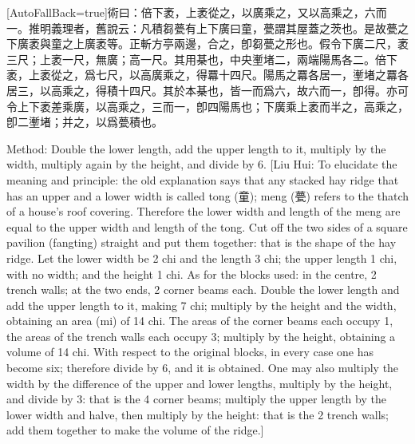 \documentclass[11pt]{article}
\newcommand{\zhsmall}{\footnotesize\color{black!70}}
\newcommand{\unitlabel}[1]{\marginpar{\raggedleft\tiny\color{gray}#1}}
\newenvironment{unitzh}{\par\CJKfontspec{Noto Serif CJK SC}[AutoFallBack=true]\large\linespread{1.25}\selectfont}{\par}
\newenvironment{uniten}{\par\small\color{black!85}}{\par\medskip}
\begin{document}
\begin{unitzh}\unitlabel{jiuzhang-020.7}術曰：倍下袤，上袤從之，以廣乘之，又以高乘之，六而一。{\zhsmall 推明義理者，舊說云：凡積芻甍有上下廣曰童，甍謂其屋蓋之茨也。是故甍之下廣袤與童之上廣袤等。正斬方亭兩邊，合之，卽芻甍之形也。假令下廣二尺，袤三尺；上袤一尺，無廣；高一尺。其用棊也，中央壍堵二，兩端陽馬各二。倍下袤，上袤從之，爲七尺，以高廣乘之，得羃十四尺。陽馬之羃各居一，壍堵之羃各居三，以高乘之，得積十四尺。其於本棊也，皆一而爲六，故六而一，卽得。亦可令上下袤差乘廣，以高乘之，三而一，卽四陽馬也；下廣乘上袤而半之，高乘之，卽二壍堵；并之，以爲甍積也。}\end{unitzh}
\begin{uniten}Method: Double the lower length, add the upper length to it, multiply by the width, multiply again by the height, and divide by 6. [Liu Hui: To elucidate the meaning and principle: the old explanation says that any stacked hay ridge that has an upper and a lower width is called tong (童); meng (甍) refers to the thatch of a house's roof covering. Therefore the lower width and length of the meng are equal to the upper width and length of the tong. Cut off the two sides of a square pavilion (fangting) straight and put them together: that is the shape of the hay ridge. Let the lower width be 2 chi and the length 3 chi; the upper length 1 chi, with no width; and the height 1 chi. As for the blocks used: in the centre, 2 trench walls; at the two ends, 2 corner beams each. Double the lower length and add the upper length to it, making 7 chi; multiply by the height and the width, obtaining an area (mi) of 14 chi. The areas of the corner beams each occupy 1, the areas of the trench walls each occupy 3; multiply by the height, obtaining a volume of 14 chi. With respect to the original blocks, in every case one has become six; therefore divide by 6, and it is obtained. One may also multiply the width by the difference of the upper and lower lengths, multiply by the height, and divide by 3: that is the 4 corner beams; multiply the upper length by the lower width and halve, then multiply by the height: that is the 2 trench walls; add them together to make the volume of the ridge.]\end{uniten}
\end{document}
